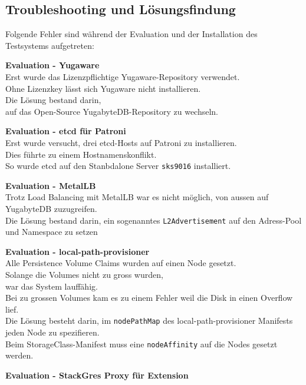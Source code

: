 
\begin{flushleft}
    \section{Troubleshooting und Lösungsfindung}
    Folgende Fehler sind während der Evaluation und der Installation des Testsystems aufgetreten:\\
    \begin{description}
        \item \textbf{Evaluation - Yugaware}\hfill \\Erst wurde das Lizenzpflichtige Yugaware-Repository verwendet.\\Ohne Lizenzkey lässt sich Yugaware nicht installieren.\\Die Lösung bestand darin,\\auf das Open-Source YugabyteDB-Repository zu wechseln.
        \item \textbf{Evaluation - etcd für Patroni}\hfill \\Erst wurde versucht, drei etcd-Hosts auf Patroni zu installieren.\\Dies führte zu einem Hostnamenskonflikt.\\So wurde etcd auf den Stanbdalone Server \texttt{sks9016} installiert.
        \item \textbf{Evaluation - MetalLB}\hfill \\Trotz Load Balancing mit \Gls{MetalLB} war es nicht möglich, von aussen auf YugabyteDB zuzugreifen.\\Die Lösung bestand darin, ein sogenanntes \texttt{L2Advertisement} auf den Adress-Pool und Namespace zu setzen
        \item \textbf{Evaluation - local-path-provisioner}\hfill \\Alle Persistence Volume Claims wurden auf einen Node gesetzt.\\Solange die Volumes nicht zu gross wurden,\\war das System lauffähig.\\Bei zu grossen Volumes kam es zu einem Fehler weil die Disk in einen Overflow lief.\\Die Lösung besteht darin, im \texttt{nodePathMap} des \gls{local-path-provisioner} Manifests jeden Node zu spezifieren.\\Beim StorageClass-Manifest muss eine \texttt{nodeAffinity} auf die Nodes gesetzt werden.
        \item \textbf{Evaluation - StackGres Proxy für Extension}\hfill \\

\end{description}
\end{flushleft}

